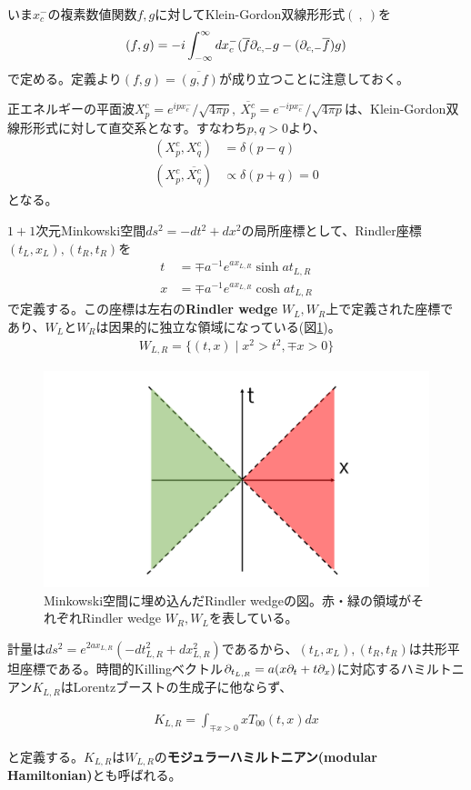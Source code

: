 いま$x_c^-$の複素数値関数$f,g$に対してKlein-Gordon双線形形式$(\ ,\ )$を
\begin{align}
(f,g)=-i\int_{-\infty}^\infty dx_c^-  (\overline{f}\partial_{c,-}g-(\partial_{c,-}\overline{f})g)
\end{align}
で定める。定義より$(f,g)=\overline{(g,f)}$が成り立つことに注意しておく。

正エネルギーの平面波$X_p^c=e^{ip x_c^-}/\sqrt{4\pi p},\ \overline{X_p^c}=e^{-ip x_c^-}/\sqrt{4\pi p}$は、Klein-Gordon双線形形式に対して直交系となす。すなわち$p,q>0$より、
\begin{align}
(X_p^c,X_q^c)&=\delta(p-q)\\ (X_p^c,\overline{X_q^c})&\propto \delta(p+q)=0
\end{align}
となる。

$1+1$次元Minkowski空間$ds^2=-dt^2+dx^2$の局所座標として、Rindler座標$(t_L,x_L),(t_R,t_R)$を
\begin{align}
t&=\mp a^{-1}e^{ax_{L,R}} \sinh at_{L,R}\\
x&=\mp a^{-1}e^{ax_{L,R}} \cosh at_{L,R}
\end{align}
で定義する。この座標は左右の\textbf{Rindler wedge} $W_L,W_R$上で定義された座標であり、$W_L$と$W_R$は因果的に独立な領域になっている(図\ref{fig:rindlerwedge})。
\begin{align}
W_{L,R}=\{(t,x)\mid x^2>t^2, \mp x>0 \}
\end{align}
\begin{figure}[h]
	\centering
	\includegraphics[width=0.7\linewidth]{rindlerwedge.pdf}
	\caption{Minkowski空間に埋め込んだRindler wedgeの図。赤・緑の領域がそれぞれRindler wedge $W_R,W_L$を表している。}
	\label{fig:rindlerwedge}
\end{figure}


計量は$ds^2=e^{2ax_{L,R}}(-dt_{L,R}^2+dx_{L,R}^2)$であるから、$(t_L,x_L),(t_R,t_R)$は共形平坦座標である。時間的Killingベクトル$\partial_{t_{L,R}}=a(x\partial_t+t\partial_x)$に対応するハミルトニアン$K_{L,R}$はLorentzブーストの生成子に他ならず、
\begin{oframed}
\begin{align}
K_{L,R}=\int_{\mp x>0} xT_{00}(t,x) dx\label{modham}
\end{align}
\end{oframed}
と定義する。$K_{L,R}$は$W_{L,R}$の\textbf{モジュラーハミルトニアン(modular Hamiltonian)}とも呼ばれる。

